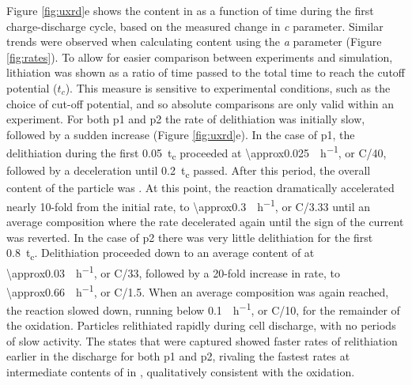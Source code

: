 \documentclass{article}
\begin{document}
Figure \ref{fig:uxrd}e shows the  content in  as a
function of time during the first charge-discharge cycle, based on the
measured change in \emph{c} parameter. Similar trends were observed
when calculating  content using the \emph{a} parameter (Figure
\ref{fig:rates}). To allow for easier comparison between experiments
and simulation, lithiation was shown as a ratio of time passed to the
total time to reach the cutoff potential ($t_c$). This measure is
sensitive to experimental conditions, such as the choice of cut-off
potential, and so absolute comparisons are only valid within an
experiment. For both \gls{p1} and \gls{p2} the rate of delithiation
was initially slow, followed by a sudden increase (Figure
\ref{fig:uxrd}e). In the case of \gls{p1}, the delithiation during the
first \SI{0.05}{t_c} proceeded at \SI{\approx0.025}{\per\hour},
or C/40, followed by a deceleration until \SI{0.2}{t_c} passed. After
this period, the overall content of the particle was
. At this point, the
reaction dramatically accelerated nearly 10-fold from the initial
rate, to \SI{\approx0.3}{\per\hour}, or C/3.33 until an average
composition  where the rate decelerated again until the sign
of the current was reverted. In the case of \gls{p2} there was very
little delithiation for the first \SI{0.8}{t_c}. Delithiation
proceeded down to an average content of  at
\SI{\approx0.03}{\per\hour}, or C/33, followed by a 20-fold
increase in rate, to \SI{\approx0.66}{\per\hour}, or
C/1.5. When an average composition  was again reached, the
reaction slowed down, running below \SI{0.1}{\per\hour}, or
C/10, for the remainder of the oxidation. Particles relithiated
rapidly during cell discharge, with no periods of slow activity. The
states that were captured showed faster rates of relithiation earlier
in the discharge for both \gls{p1} and \gls{p2}, rivaling the fastest
rates at intermediate contents of  in , qualitatively
consistent with the oxidation. 

\end{document}
